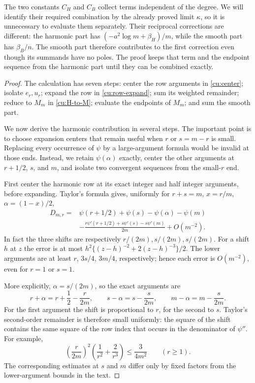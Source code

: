 The two constants $C_H$ and $C_B$ collect terms independent of the
degree. We will identify their required combination by the already
proved limit $\kappa$, so it is unnecessary to evaluate them
separately. Their reciprocal corrections are different: the harmonic
part has $(-a^2\log m+\beta_H)/m$, while the smooth part has
$\beta_B/n$. The smooth part therefore contributes to the first
correction even though its summands have no poles. The proof keeps
that term and the endpoint sequence from the harmonic part until
they can be combined exactly.
\begin{proof}
The calculation has seven steps: center the row arguments in
\eqref{cu:center}; isolate $e_r,u_r$; expand the row in
\eqref{cu:row-expand}; sum its weighted remainder; reduce to $M_m$ in
\eqref{cu:H-to-M}; evaluate the endpoints of $M_m$; and sum the smooth part.

We now derive the harmonic contribution in several steps. The
important point is to choose expansion centers that remain useful
when $r$ or $s=m-r$ is small. Replacing every occurrence of $\psi$
by a large-argument formula would be invalid at those ends. Instead,
we retain $\psi(\alpha)$ exactly, center the other arguments at
$r+1/2$, $s$, and $m$, and isolate two convergent sequences from
the small-$r$ end.

First center the harmonic row at its exact integer and half integer
arguments, before expanding. Taylor's formula gives, uniformly for
$r+s=m$, $x=r/m$, $\alpha=(1-x)/2$,
\begin{equation}\label{cu:center}
 \begin{split}
 D_{m,r}={}&\psi(r+1/2)+\psi(s)-\psi(\alpha)-\psi(m)\\
 &-\frac{r\psi'(r+1/2)+s\psi'(s)-s\psi'(m)}{2m}+O(m^{-2}).
 \end{split}
\end{equation}
In fact the three shifts are respectively $r/(2m),s/(2m),s/(2m)$.
For a shift $h$ at $z$ the error is at most
$h^2\{(z-h)^{-2}+2(z-h)^{-3}\}/2$.
The lower arguments are at least $r$, $3s/4$, $3m/4$, respectively;
hence each error is $O(m^{-2})$, even for $r=1$ or $s=1$.

More explicitly, $\alpha=s/(2m)$, so the exact arguments are
\[
 r+\alpha=r+\frac12-\frac{r}{2m},\qquad
 s-\alpha=s-\frac{s}{2m},\qquad
 m-\alpha=m-\frac{s}{2m}.
\]
For the first argument the shift is proportional to $r$, for the
second to $s$. Taylor's second-order remainder is therefore small
uniformly: the square of the shift contains the same square of
the row index that occurs in the denominator of $\psi''$.
For example,
\[
 \left(\frac{r}{2m}\right)^2
       \left(\frac1{r^2}+\frac2{r^3}\right)
 \leq\frac{3}{4m^2}\qquad(r\geq1).
\]
The corresponding estimates at $s$ and $m$ differ only by fixed
factors from the lower-argument bounds in the text.


\end{proof}
